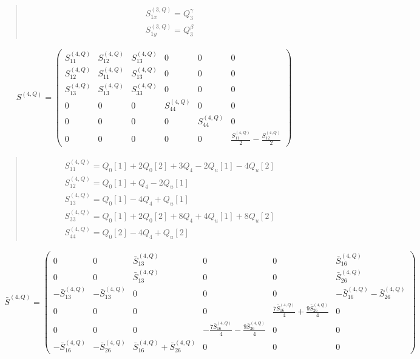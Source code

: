 \documentclass[fleqn,10pt]{jsarticle}
\begin{document}
\begin{quote}
\begin{align*}
& S^{(3,Q)}_{1x} = Q_{3}^{\gamma} \\
& S^{(3,Q)}_{1y} = Q_{3}^{\beta}
\end{align*}
\end{quote}
\begin{align*}
S^{(4,Q)} = \begin{pmatrix} S^{(4,Q)}_{11} & S^{(4,Q)}_{12} & S^{(4,Q)}_{13} & 0 & 0 & 0 \\ S^{(4,Q)}_{12} & S^{(4,Q)}_{11} & S^{(4,Q)}_{13} & 0 & 0 & 0 \\ S^{(4,Q)}_{13} & S^{(4,Q)}_{13} & S^{(4,Q)}_{33} & 0 & 0 & 0 \\ 0 & 0 & 0 & S^{(4,Q)}_{44} & 0 & 0 \\ 0 & 0 & 0 & 0 & S^{(4,Q)}_{44} & 0 \\ 0 & 0 & 0 & 0 & 0 & \frac{S^{(4,Q)}_{11}}{2} - \frac{S^{(4,Q)}_{12}}{2} \end{pmatrix}
\end{align*}
\begin{quote}
\begin{align*}
& S^{(4,Q)}_{11} = Q_{0}[1] + 2 Q_{0}[2] + 3 Q_{4} - 2 Q_{u}[1] - 4 Q_{u}[2] \\
& S^{(4,Q)}_{12} = Q_{0}[1] + Q_{4} - 2 Q_{u}[1] \\
& S^{(4,Q)}_{13} = Q_{0}[1] - 4 Q_{4} + Q_{u}[1] \\
& S^{(4,Q)}_{33} = Q_{0}[1] + 2 Q_{0}[2] + 8 Q_{4} + 4 Q_{u}[1] + 8 Q_{u}[2] \\
& S^{(4,Q)}_{44} = Q_{0}[2] - 4 Q_{4} + Q_{u}[2]
\end{align*}
\end{quote}
\begin{align*}
\bar{S}^{(4,Q)} = \begin{pmatrix} 0 & 0 & \bar{S}^{(4,Q)}_{13} & 0 & 0 & \bar{S}^{(4,Q)}_{16} \\ 0 & 0 & \bar{S}^{(4,Q)}_{13} & 0 & 0 & \bar{S}^{(4,Q)}_{26} \\ - \bar{S}^{(4,Q)}_{13} & - \bar{S}^{(4,Q)}_{13} & 0 & 0 & 0 & - \bar{S}^{(4,Q)}_{16} - \bar{S}^{(4,Q)}_{26} \\ 0 & 0 & 0 & 0 & \frac{7 \bar{S}^{(4,Q)}_{16}}{4} + \frac{9 \bar{S}^{(4,Q)}_{26}}{4} & 0 \\ 0 & 0 & 0 & - \frac{7 \bar{S}^{(4,Q)}_{16}}{4} - \frac{9 \bar{S}^{(4,Q)}_{26}}{4} & 0 & 0 \\ - \bar{S}^{(4,Q)}_{16} & - \bar{S}^{(4,Q)}_{26} & \bar{S}^{(4,Q)}_{16} + \bar{S}^{(4,Q)}_{26} & 0 & 0 & 0 \end{pmatrix}
\end{align*}
\end{document}

